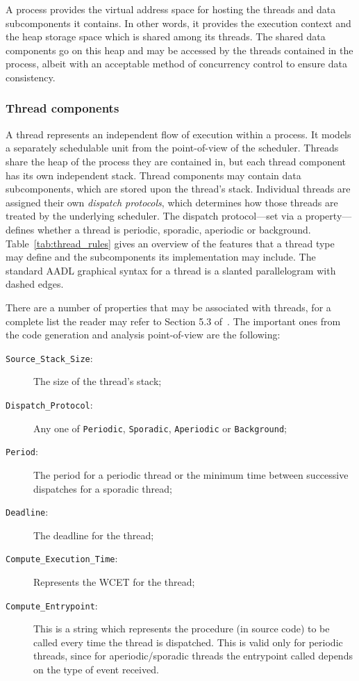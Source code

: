 A process provides the virtual address space for hosting the threads
and data subcomponents it contains. In other words, it provides the
execution context and the heap storage space which is shared among its
threads. The shared data components go on this heap and may be
accessed by the threads contained in the process, albeit with an
acceptable method of concurrency control to ensure data consistency.

\subsubsection{Thread components} A thread represents an independent
flow of execution within a process. It models a separately schedulable
unit from the point-of-view of the scheduler. Threads share the heap
of the process they are contained in, but each thread component has
its own independent stack. Thread components may contain data
subcomponents, which are stored upon the thread's stack. Individual
threads are assigned their own \emph{dispatch protocols}, which
determines how those threads are treated by the underlying
scheduler. The dispatch protocol---set via a property---defines
whether a thread is periodic, sporadic, aperiodic or
background. Table~\ref{tab:thread_rules} gives an overview of the
features that a thread type may define and the subcomponents its
implementation may include. The standard AADL graphical syntax for a
thread is a slanted parallelogram with dashed edges. 

There are a number of properties that may be associated with threads,
for a complete list the reader may refer to Section 5.3
of~\cite{AS5506}. The important ones from the code generation and
analysis point-of-view are the following:

\begin{description}
\item[\texttt{Source\_Stack\_Size}:]{The size of the thread's stack;}
\item[\texttt{Dispatch\_Protocol}:]{Any one of \texttt{Periodic},
  \texttt{Sporadic}, \texttt{Aperiodic} or \texttt{Background};}
\item[\texttt{Period}:]{The period for a periodic thread or the
  minimum time between successive dispatches for a sporadic thread;}
\item[\texttt{Deadline}:]{The deadline for the thread;}
\item[\texttt{Compute\_Execution\_Time}:]{Represents the WCET for the
  thread;}
\item[\texttt{Compute\_Entrypoint}:]{This is a string which represents
  the procedure (in source code) to be called every time the thread is
  dispatched. This is valid only for periodic threads, since for
  aperiodic/sporadic threads the entrypoint called depends on the type
  of event received.}
\end{description}

